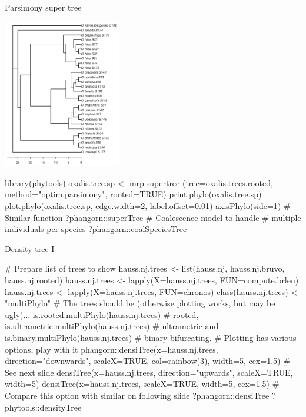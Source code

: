 \documentclass[compress, ucs, xelatex, 11pt, xcolor=svgnames, aspectratio=169,
	hyperref={
		bookmarks=true,
		unicode=true,
		colorlinks=true,
		pdftitle={Molecular data in R},
		plainpages=false,
		pdfauthor={Vojtech Zeisek},
		pdfsubject={Course about phylogeny and evolution in R},
		pdfcreator={XeLaTeX},
		pdfkeywords={R, evolution, phylogeny, molecular data},
		linkcolor=Crimson, %
		anchorcolor=Magenta, %
		citecolor=Magenta, %
		filecolor=Magenta, %
		menucolor=Magenta, %
		urlcolor=DodgerBlue, %
		pdftex},
	url={hyphens, lowtilde} %
	]{beamer}
\begin{document}
\begin{frame}[fragile]{Parsimony super tree}
	\begin{multicols}{2}
		\begin{center}
			\includegraphics[height=6.5cm]{oxalis-pars.png}
		\end{center}
		\begin{spluscode}
    library(phytools)
    oxalis.tree.sp <- mrp.supertree
      (tree=oxalis.trees.rooted,
      method="optim.parsimony",
      rooted=TRUE)
    print.phylo(oxalis.tree.sp)
    plot.phylo(oxalis.tree.sp,
      edge.width=2, label.offset=0.01)
    axisPhylo(side=1)
    # Similar function
    ?phangorn::superTree
    # Coalescence model to handle
    # multiple individuals per species
    ?phangorn::coalSpeciesTree
		\end{spluscode}
	\end{multicols}
\end{frame}

\begin{frame}[fragile]{Density tree I}
	\begin{spluscode}
    # Prepare list of trees to show
    hauss.nj.trees <- list(hauss.nj, hauss.nj.bruvo, hauss.nj.rooted)
    hauss.nj.trees <- lapply(X=hauss.nj.trees, FUN=compute.brlen)
    hauss.nj.trees <- lapply(X=hauss.nj.trees, FUN=chronos)
    class(hauss.nj.trees) <- "multiPhylo"
    # The trees should be (otherwise plotting works, but may be ugly)...
    is.rooted.multiPhylo(hauss.nj.trees) # rooted,
    is.ultrametric.multiPhylo(hauss.nj.trees) # ultrametric and
    is.binary.multiPhylo(hauss.nj.trees) # binary bifurcating.
    # Plotting has various options, play with it
    phangorn::densiTree(x=hauss.nj.trees, direction="downwards",
      scaleX=TRUE, col=rainbow(3), width=5, cex=1.5) # See next slide
    densiTree(x=hauss.nj.trees, direction="upwards", scaleX=TRUE, width=5)
    densiTree(x=hauss.nj.trees, scaleX=TRUE, width=5, cex=1.5)
    # Compare this option with similar on following slide
    ?phangorn::densiTree
    ?phytools::densityTree
	\end{spluscode}
\end{frame}
\end{document}
